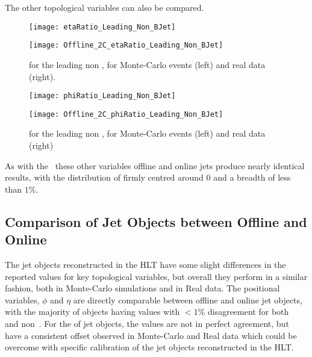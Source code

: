 	The other topological variables can also be compared.

	\begin{figure}[h]
		\centering
		\begin{minipage}[h]{0.48\linewidth}
			\texttt{[image: etaRatio\_Leading\_Non\_BJet]}

		\end{minipage}
		\quad
		\begin{minipage}[h]{0.48\linewidth}
			\texttt{[image: Offline\_2C\_etaRatio\_Leading\_Non\_BJet]}
		\end{minipage}
		\caption{\dee for the leading non \bjet, for Monte-Carlo events (left) and real data (right).}
		\label{fig:O:leadingnonbeta}
	\end{figure}

	\begin{figure}[h]
		\centering
		\begin{minipage}[h]{0.48\linewidth}
			\texttt{[image: phiRatio\_Leading\_Non\_BJet]}

		\end{minipage}
		\quad
		\begin{minipage}[h]{0.48\linewidth}
			\texttt{[image: Offline\_2C\_phiRatio\_Leading\_Non\_BJet]}
		\end{minipage}
		\caption{\dphph for the leading non \bjet, for Monte-Carlo events (left) and real data (right)}
		\label{fig:O:leadingnonbphi}
	\end{figure}

	As with the \bjets\, these other variables offline and online jets produce nearly identical results, with the distribution of \dxx firmly centred around 0 and a breadth of less than $1\%$.

	\subsection{Comparison of Jet Objects between Offline and Online}

		The jet objects reconstructed in the HLT have some slight differences in the reported values for key topological variables, but overall they perform in a similar fashion, both in Monte-Carlo simulations and in Real data. The positional variables, $\phi$ and $\eta$ are directly comparable between offline and online jet objects, with the majority of objects having values with $<1\%$ disagreement for both \bjets\, and non \bjets\,. For the \pt of jet objects, the values are not in perfect agreement, but have a consistent offset observed in Monte-Carlo and Real data which could be overcome with specific calibration of the jet objects reconstructed in the HLT.

